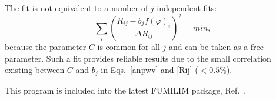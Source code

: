 \documentclass[twocolumn,epjc3]{svjour3}
\begin{document}
The fit is not equivalent to a number of $j$ independent fits:
\begin{equation}\label{anpwvs}
  \sum_{i} \left(\frac{R_{ij}-b_jf(\varphi)_i}{\Delta R_{ij}}\right)^2 = min,
\end{equation}
because the parameter $C$ is common for all $j$ and can be taken as a free parameter.  Such a fit provides reliable results due to the small correlation existing between $C$ and $b_j$ in Eqs.~\ref{anpwv} and \ref{Rij} ($<0.5$\%).

This program is included into the latest FUMILIM package, Ref.~\cite{Sitnik:2016xxx}.


\end{document}
